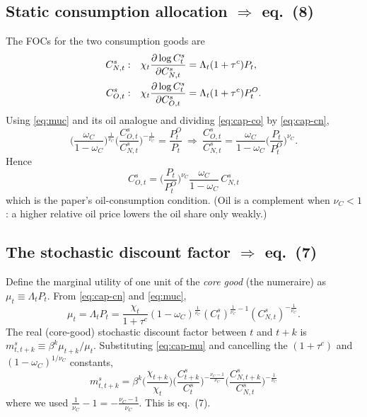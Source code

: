 \subsection{Static consumption allocation \texorpdfstring{$\Rightarrow$}{=>} eq.\ (8)}
The FOCs for the two consumption goods are
\begin{align}
C^s_{N,t}:&\quad \chi_t\frac{\partial \log C^s_t}{\partial C^s_{N,t}}=\Lambda_t(1+\tau^c)P_t,\label{eq:cap-cn}\\
C^s_{O,t}:&\quad \chi_t\frac{\partial \log C^s_t}{\partial C^s_{O,t}}=\Lambda_t(1+\tau^c)P^O_t.\label{eq:cap-co}
\end{align}
Using \eqref{eq:muc} and its oil analogue and dividing \eqref{eq:cap-co} by \eqref{eq:cap-cn},
\[
\Big(\frac{\omega_C}{1-\omega_C}\Big)^{\frac1{\nu_C}}\Big(\frac{C^s_{O,t}}{C^s_{N,t}}\Big)^{-\frac1{\nu_C}}
=\frac{P^O_t}{P_t}
\ \Longrightarrow\
\frac{C^s_{O,t}}{C^s_{N,t}}=\frac{\omega_C}{1-\omega_C}\Big(\frac{P_t}{P^O_t}\Big)^{\nu_C}.
\]
Hence
\begin{equation}\label{eq:8}
\boxed{\,C^s_{O,t}=\Big(\frac{P_t}{P^O_t}\Big)^{\nu_C}\frac{\omega_C}{1-\omega_C}\,C^s_{N,t}\,}
\tag{P-8}
\end{equation}
which is the paper's oil-consumption condition. (Oil is a complement when $\nu_C<1$: a higher
relative oil price lowers the oil share only weakly.)

\subsection{The stochastic discount factor \texorpdfstring{$\Rightarrow$}{=>} eq.\ (7)}
Define the marginal utility of one unit of the \emph{core good} (the numeraire) as
$\mu_t\equiv\Lambda_t P_t$. From \eqref{eq:cap-cn} and \eqref{eq:muc},
\begin{equation}\label{eq:cap-mu}
\mu_t=\Lambda_tP_t=\frac{\chi_t}{1+\tau^c}(1-\omega_C)^{\frac1{\nu_C}}
(C^s_t)^{\frac1{\nu_C}-1}(C^s_{N,t})^{-\frac1{\nu_C}} .
\end{equation}
The real (core-good) stochastic discount factor between $t$ and $t+k$ is
$m^s_{t,t+k}\equiv\beta^k\mu_{t+k}/\mu_t$. Substituting \eqref{eq:cap-mu} and cancelling the
$(1+\tau^c)$ and $(1-\omega_C)^{1/\nu_C}$ constants,
\begin{equation}\label{eq:7}
\boxed{\,m^s_{t,t+k}=\beta^k\Big(\frac{\chi_{t+k}}{\chi_t}\Big)
\Big(\frac{C^s_{t+k}}{C^s_t}\Big)^{-\frac{\nu_C-1}{\nu_C}}
\Big(\frac{C^s_{N,t+k}}{C^s_{N,t}}\Big)^{-\frac1{\nu_C}}\,}
\tag{P-7}
\end{equation}
where we used $\tfrac1{\nu_C}-1=-\tfrac{\nu_C-1}{\nu_C}$. This is eq.\ (7).

